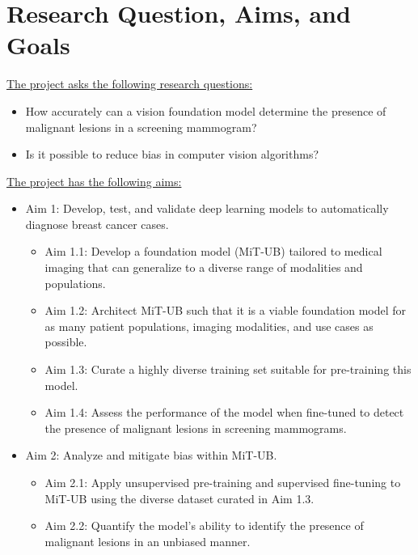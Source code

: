 \documentclass[12pt]{article}
\begin{document}
\section{Research Question, Aims, and Goals}
\noindent

\underline{The project asks the following research questions:}
\begin{itemize}
    \item How accurately can a vision foundation model determine the presence of malignant lesions in a screening mammogram?
    \item Is it possible to reduce bias in computer vision algorithms?
\end{itemize}

\underline{The project has the following aims:}
\begin{itemize}
    \item Aim 1: Develop, test, and validate deep learning models to automatically diagnose breast cancer cases.
    \begin{itemize}
        \item Aim 1.1: Develop a foundation model (MiT-UB) tailored to medical imaging that can generalize to a diverse range of modalities and populations.
        \item Aim 1.2: Architect MiT-UB such that it is a viable foundation model for as many patient populations, imaging modalities, and use cases as possible.
        \item Aim 1.3: Curate a highly diverse training set suitable for pre-training this model.
        \item Aim 1.4: Assess the performance of the model when fine-tuned to detect the presence of malignant lesions in screening mammograms.
    \end{itemize}
    \item Aim 2: Analyze and mitigate bias within MiT-UB.
    \begin{itemize}
        \item Aim 2.1: Apply unsupervised pre-training and supervised fine-tuning to MiT-UB using the diverse dataset curated in Aim 1.3.
        \item Aim 2.2: Quantify the model’s ability to identify the presence of malignant lesions in an unbiased manner.
    \end{itemize}
\end{itemize}
\end{document}
